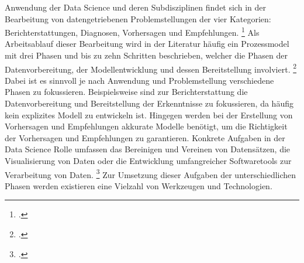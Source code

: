 Anwendung der Data Science und deren Subdisziplinen findet sich in der Bearbeitung von datengetriebenen Problemstellungen der vier Kategorien: Berichterstattungen, Diagnosen, Vorhersagen und Empfehlungen. \footcite[prenote][postnote]{four main categories}
Als Arbeitsablauf dieser Bearbeitung wird in der Literatur häufig ein Prozessmodel mit drei Phasen und bis zu zehn Schritten beschrieben, welcher die Phasen der Datenvorbereitung, der Modellentwicklung und dessen Bereitstellung involviert. \footcite[prenote][postnote]{data science process as roughly 3}
Dabei ist es sinnvoll je nach Anwendung und Problemstellung verschiedene Phasen zu fokussieren.
Beispielsweise sind zur Berichterstattung die Datenvorbereitung und Bereitstellung der Erkenntnisse zu fokussieren, da häufig kein explizites Modell zu entwickeln ist.
Hingegen werden bei der Erstellung von Vorhersagen und Empfehlungen akkurate Modelle benötigt, um die Richtigkeit der Vorhersagen und Empfehlungen zu garantieren.
Konkrete Aufgaben in der Data Science Rolle umfassen das Bereinigen und Vereinen von Datensätzen, die Visualisierung von Daten oder die Entwicklung umfangreicher Softwaretools zur Verarbeitung von Daten. \footcite[prenote][postnote]{tasks of a data scientist}
Zur Umsetzung dieser Aufgaben der unterschiedlichen Phasen werden existieren eine Vielzahl von Werkzeugen und Technologien.
